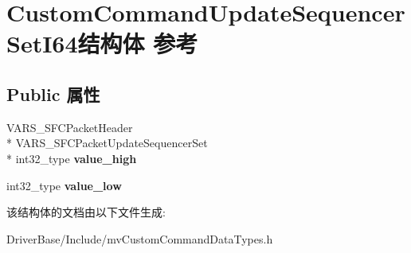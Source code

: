 \hypertarget{struct_custom_command_update_sequencer_set_i64}{\section{Custom\+Command\+Update\+Sequencer\+Set\+I64结构体 参考}
\label{struct_custom_command_update_sequencer_set_i64}
}
\subsection*{Public 属性}
\begin{DoxyCompactItemize}
\item 
\hypertarget{struct_custom_command_update_sequencer_set_i64_a4a3f6586294f5d665911161a3f1f67b1}{V\+A\+R\+S\+\_\+\+S\+F\+C\+Packet\+Header \\*
V\+A\+R\+S\+\_\+\+S\+F\+C\+Packet\+Update\+Sequencer\+Set \\*
int32\+\_\+type {\bfseries value\+\_\+high}}\label{struct_custom_command_update_sequencer_set_i64_a4a3f6586294f5d665911161a3f1f67b1}

\item 
\hypertarget{struct_custom_command_update_sequencer_set_i64_a359210872184d0f258f209041e5b42a9}{int32\+\_\+type {\bfseries value\+\_\+low}}\label{struct_custom_command_update_sequencer_set_i64_a359210872184d0f258f209041e5b42a9}

\end{DoxyCompactItemize}


该结构体的文档由以下文件生成\+:\begin{DoxyCompactItemize}
\item 
Driver\+Base/\+Include/mv\+Custom\+Command\+Data\+Types.\+h\end{DoxyCompactItemize}

